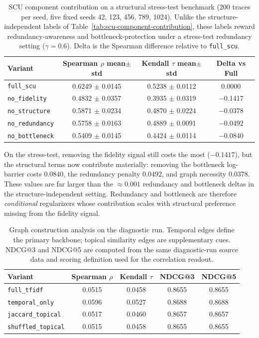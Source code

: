 \documentclass[a4paper,fleqn]{cas-sc}
\begin{document}
\begin{table}[ht]
\caption{SCU component contribution on a structural stress-test benchmark (200 traces per seed, five fixed seeds 42, 123, 456, 789, 1024). Unlike the structure-independent labels of Table~\ref{tab:scu-component-contribution}, these labels reward redundancy-awareness and bottleneck-protection under a stress-test redundancy setting ($\gamma=0.6$). Delta is the Spearman difference relative to \texttt{full\_scu}.}
\label{tab:scu-stress-test}
\centering
\small
\renewcommand{\arraystretch}{1.08}
\begin{tabular}{lccc}
\toprule
\textbf{Variant} & \textbf{Spearman $\rho$ mean$\pm$std} & \textbf{Kendall $\tau$ mean$\pm$std} & \textbf{Delta vs Full} \\
\midrule
\texttt{full\_scu} & 0.6249 $\pm$ 0.0145 & 0.5238 $\pm$ 0.0112 & 0.0000 \\
\texttt{no\_fidelity} & 0.4832 $\pm$ 0.0357 & 0.3935 $\pm$ 0.0319 & $-$0.1417 \\
\texttt{no\_structure} & 0.5871 $\pm$ 0.0234 & 0.4870 $\pm$ 0.0224 & $-$0.0378 \\
\texttt{no\_redundancy} & 0.5758 $\pm$ 0.0163 & 0.4889 $\pm$ 0.0091 & $-$0.0492 \\
\texttt{no\_bottleneck} & 0.5409 $\pm$ 0.0145 & 0.4424 $\pm$ 0.0114 & $-$0.0840 \\
\bottomrule
\end{tabular}
\end{table}

On the stress-test, removing the fidelity signal still costs the most ($-0.1417$), but the structural terms now contribute materially: removing the bottleneck log-barrier costs $0.0840$, the redundancy penalty $0.0492$, and graph necessity $0.0378$. These values are far larger than the $\approx 0.001$ redundancy and bottleneck deltas in the structure-independent setting. Redundancy and bottleneck are therefore \emph{conditional} regularizers whose contribution scales with structural preference missing from the fidelity signal.

\begin{table}[ht]
\caption{Graph construction analysis on the diagnostic run. Temporal edges define the primary backbone; topical similarity edges are supplementary cues. NDCG@3 and NDCG@5 are computed from the same diagnostic-run source data and scoring definition used for the correlation readout.}
\label{tab:graph-construction-analysis}
\centering
\small
\renewcommand{\arraystretch}{1.08}
\begin{tabular}{lcccc}
\toprule
\textbf{Variant} & \textbf{Spearman $\rho$} & \textbf{Kendall $\tau$} & \textbf{NDCG@3} & \textbf{NDCG@5} \\
\midrule
\texttt{full\_tfidf} & 0.0515 & 0.0458 & 0.8655 & 0.8655 \\
\texttt{temporal\_only} & 0.0596 & 0.0527 & 0.8688 & 0.8688 \\
\texttt{jaccard\_topical} & 0.0517 & 0.0460 & 0.8657 & 0.8657 \\
\texttt{shuffled\_topical} & 0.0515 & 0.0458 & 0.8655 & 0.8655 \\
\bottomrule
\end{tabular}
\end{table}
\end{document}
